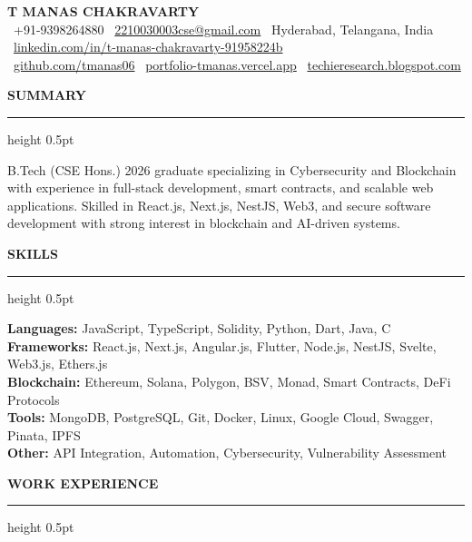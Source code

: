 \documentclass[11pt,a4paper]{article}
\newcommand{\cvsection}[1]{%
  \vspace{7pt}%
  {\large\textbf{\MakeUppercase{#1}}}%
  \vspace{2pt}%
  \hrule height 0.5pt%
  \vspace{4pt}%
}
\begin{document}
\begin{center}
  {\Huge \textbf{T MANAS CHAKRAVARTY}} \\[6pt]
  \small
  \faPhone*\ +91-9398264880 \quad \textbar \quad
  \faEnvelope\ \href{mailto:2210030003cse@gmail.com}{2210030003cse@gmail.com} \quad \textbar \quad
  \faMapMarker*\ Hyderabad, Telangana, India \\[3pt]
  \faLinkedin\ \href{https://linkedin.com/in/t-manas-chakravarty-91958224b}{linkedin.com/in/t-manas-chakravarty-91958224b} \\[3pt]
  \faGithub\ \href{https://github.com/tmanas06}{github.com/tmanas06} \quad \textbar \quad
  \faGlobe\ \href{https://portfolio-tmanas.vercel.app}{portfolio-tmanas.vercel.app} \quad \textbar \quad
  \faBlogger\ \href{https://techieresearch.blogspot.com}{techieresearch.blogspot.com}
\end{center}

\cvsection{Summary}
B.Tech (CSE Hons.) 2026 graduate specializing in Cybersecurity and Blockchain with experience in full-stack development, smart contracts, and scalable web applications. Skilled in React.js, Next.js, NestJS, Web3, and secure software development with strong interest in blockchain and AI-driven systems.

\cvsection{Skills}
\noindent\textbf{Languages:} JavaScript, TypeScript, Solidity, Python, Dart, Java, C \\
\textbf{Frameworks:} React.js, Next.js, Angular.js, Flutter, Node.js, NestJS, Svelte, Web3.js, Ethers.js \\
\textbf{Blockchain:} Ethereum, Solana, Polygon, BSV, Monad, Smart Contracts, DeFi Protocols \\
\textbf{Tools:} MongoDB, PostgreSQL, Git, Docker, Linux, Google Cloud, Swagger, Pinata, IPFS \\
\textbf{Other:} API Integration, Automation, Cybersecurity, Vulnerability Assessment

\cvsection{Work Experience}
\end{document}
